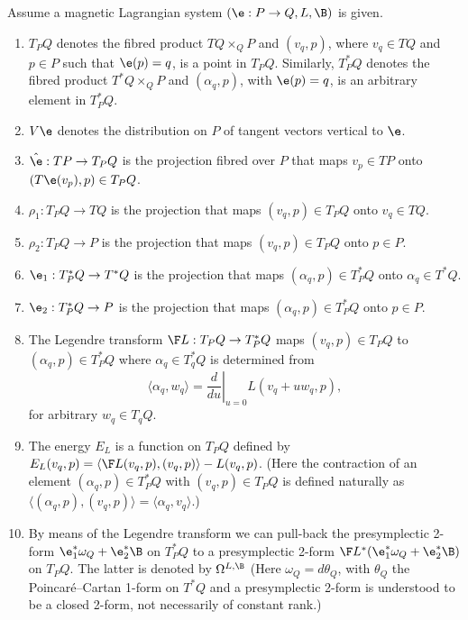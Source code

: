 \begin{definition}
Assume a magnetic Lagrangian system $(\e:P\to Q, L,\B)$ is given.
\begin{enumerate}\itemsep=0pt
\item   $T_PQ$ denotes the f\/ibred product $TQ\times_Q P$ and $(v_q,p)$, where $v_q\in TQ$ and $p\in P$ such that $\e(p)=q$, is a point in $T_PQ$. Similarly, $T_P^*Q$ denotes the f\/ibred product $T^*Q\times_Q P$ and $(\alpha_q,p)$, with $\e(p)=q$, is an arbitrary element in $T^*_PQ$.
\item $V\e$ denotes the distribution on $P$ of tangent vectors vertical to $\e$.
\item $\hat \e : TP \to T_PQ$ is the projection f\/ibred over $P$ that maps $v_p\in TP$ onto $(T\e(v_p),p)\in T_PQ$.
\item $\rho_1:T_PQ \to TQ$ is the projection that maps $(v_q,p )\in T_PQ$ onto $v_q\in TQ$.
\item $\rho_2: T_PQ \to P$ is the projection that maps $(v_q,p)\in T_PQ$ onto $p\in P$.
\item $\e_1:T_P^*Q \to T^*Q$ is the projection that maps $(\alpha_q,p )\in T_P^*Q$ onto $\alpha_q\in T^*Q$.
\item $\e_2: T_P^*Q \to P$ is the projection that maps $(\alpha_q,p)\in T_P^*Q$ onto $p\in P$.
\item The Legendre transform $\F L:T_PQ \to T_P^*Q$ maps $(v_q,p)\in T_PQ$ to $(\alpha_q,p)\in T^*_PQ$ where $\alpha_q\in T^*_qQ$ is determined from \[\langle \alpha_q, w_q\rangle = \left.\frac{d}{du}\right|_{u=0} L(v_q+uw_q,p),\] for arbitrary $w_q\in T_qQ$.
\item The energy $E_L$ is a function on $T_PQ$ def\/ined by $E_L(v_q,p) =\langle \F L (v_q,p), (v_q,p)\rangle - L(v_q,p)$. (Here the contraction of an element $(\alpha_q,p)\in T^*_PQ$ with $(v_q,p)\in T_PQ$ is def\/ined naturally as $\langle (\alpha_q,p),(v_q,p) \rangle =\langle \alpha_q,v_q\rangle$.)
\item By means of the Legendre transform we can pull-back the presymplectic 2-form $\e^*_1\omega_{Q}+\e^*_2\B$ on $T^*_PQ$ to a presymplectic 2-form $\F L^*(\e^*_1\omega_{Q} +\e^*_2\B)$ on $T_PQ$. The latter is denoted by $\Omega^{L,\B}$ (Here $\omega_{Q}=d\theta_{Q}$, with $\theta_{Q}$ the Poincar\'e--Cartan 1-form on $T^*Q$ and a presymplectic 2-form is understood to be a closed 2-form, not necessarily of constant rank.)
\end{enumerate}
\end{definition}



